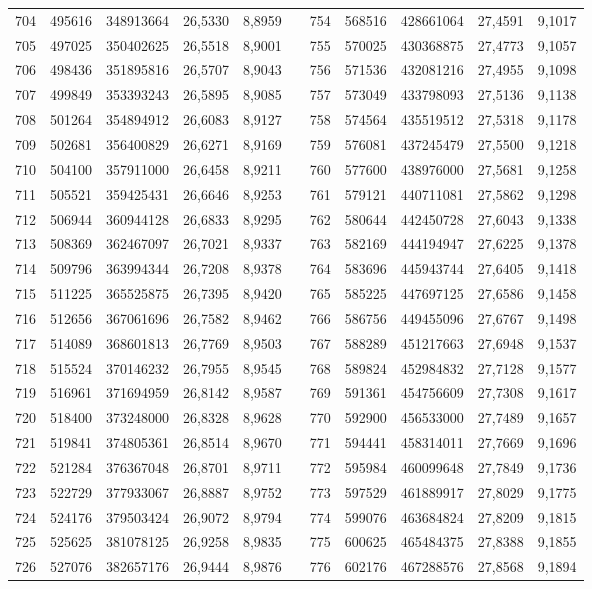 \begin{longtable}{rrrrrrrrrrr}
704&495616&348913664&26,5330&8,8959&&754&568516&428661064&27,4591&9,1017\\
705&497025&350402625&26,5518&8,9001&&755&570025&430368875&27,4773&9,1057\\
706&498436&351895816&26,5707&8,9043&&756&571536&432081216&27,4955&9,1098\\
707&499849&353393243&26,5895&8,9085&&757&573049&433798093&27,5136&9,1138\\
708&501264&354894912&26,6083&8,9127&&758&574564&435519512&27,5318&9,1178\\
709&502681&356400829&26,6271&8,9169&&759&576081&437245479&27,5500&9,1218\\
710&504100&357911000&26,6458&8,9211&&760&577600&438976000&27,5681&9,1258\\
711&505521&359425431&26,6646&8,9253&&761&579121&440711081&27,5862&9,1298\\
712&506944&360944128&26,6833&8,9295&&762&580644&442450728&27,6043&9,1338\\
713&508369&362467097&26,7021&8,9337&&763&582169&444194947&27,6225&9,1378\\
714&509796&363994344&26,7208&8,9378&&764&583696&445943744&27,6405&9,1418\\
715&511225&365525875&26,7395&8,9420&&765&585225&447697125&27,6586&9,1458\\
716&512656&367061696&26,7582&8,9462&&766&586756&449455096&27,6767&9,1498\\
717&514089&368601813&26,7769&8,9503&&767&588289&451217663&27,6948&9,1537\\
718&515524&370146232&26,7955&8,9545&&768&589824&452984832&27,7128&9,1577\\
719&516961&371694959&26,8142&8,9587&&769&591361&454756609&27,7308&9,1617\\
720&518400&373248000&26,8328&8,9628&&770&592900&456533000&27,7489&9,1657\\
721&519841&374805361&26,8514&8,9670&&771&594441&458314011&27,7669&9,1696\\
722&521284&376367048&26,8701&8,9711&&772&595984&460099648&27,7849&9,1736\\
723&522729&377933067&26,8887&8,9752&&773&597529&461889917&27,8029&9,1775\\
724&524176&379503424&26,9072&8,9794&&774&599076&463684824&27,8209&9,1815\\
725&525625&381078125&26,9258&8,9835&&775&600625&465484375&27,8388&9,1855\\
726&527076&382657176&26,9444&8,9876&&776&602176&467288576&27,8568&9,1894\\

\end{longtable}
